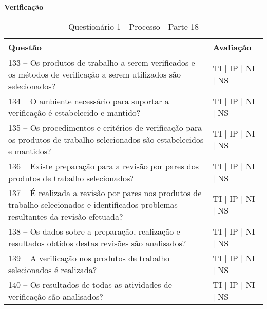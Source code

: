 \documentclass[openany,10pt,a4paper]{article}
\begin{document}
\begin{appendix}
\begin{table}[h]
\textbf{Verificação }
	\centering
	\caption{Questionário 1 - Processo - Parte 18}
	\begin{tabular}{p{3.5in}p{2in}}		
		\toprule
		\textbf{Questão}  & \textbf{Avaliação}\\ 
		\midrule
		133 – Os produtos de trabalho a serem verificados e os métodos de verificação a serem 
utilizados são selecionados?
 & TI | IP | NI | NS \\
        \midrule
		134 – O ambiente necessário para suportar a verificação é estabelecido e mantido?
 & TI | IP | NI | NS \\
		\midrule
		135 – Os procedimentos e critérios de verificação para os produtos de trabalho selecionados são 
estabelecidos e mantidos?
 & TI | IP | NI | NS \\
		\midrule
        136 – Existe preparação para a revisão por pares dos produtos de trabalho selecionados?
 & TI | IP | NI | NS \\
		\midrule
		137 – É realizada a revisão por pares nos produtos de trabalho selecionados e identificados 
problemas resultantes da revisão efetuada?
  & TI | IP | NI | NS \\
		\midrule
		138 – Os dados sobre a preparação, realização e resultados obtidos destas revisões são 
analisados?
 & TI | IP | NI | NS \\
 \midrule
		139 – A verificação nos produtos de trabalho selecionados é realizada?
 & TI | IP | NI | NS \\
  \midrule
		140 – Os resultados de todas as atividades de verificação são analisados? 
 & TI | IP | NI | NS \\
		\bottomrule
	\end{tabular} 
	\label{tab:tabela1}
\end{table}



\end{appendix}
\end{document}
